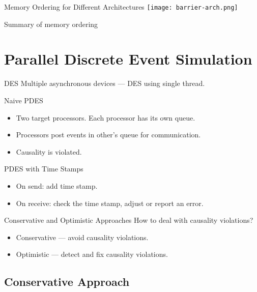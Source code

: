 \begin{frame}{Memory Ordering for Different Architectures}
  \centering
  \texttt{[image: barrier-arch.png]}

  \tiny{Summary of memory ordering~\cite{mckenney-memory-barriers}}
\end{frame}

\section{Parallel Discrete Event Simulation}

\begin{frame}{DES}
  Multiple asynchronous devices --- DES using single thread.
  \vfill
  \centering
\end{frame}

\begin{frame}{Naive PDES}
  \begin{itemize}
    \item Two target processors. Each processor has its own queue.
    \item Processors post events in other's queue for communication. \pause
    \item Causality is violated.
  \end{itemize}
  \centering
\end{frame}

\begin{frame}{PDES with Time Stamps}
  \begin{itemize}
    \item On send: add time stamp.
    \item On receive: check the time stamp, adjust or report an error.
  \end{itemize}
  \centering
\end{frame}

\begin{frame}{Conservative and Optimistic Approaches}
  How to deal with causality violations?
  \begin{itemize}
    \item Conservative --- avoid causality violations.
    \item Optimistic --- detect and fix causality violations.
  \end{itemize}
\end{frame}

\subsection{Conservative Approach}

